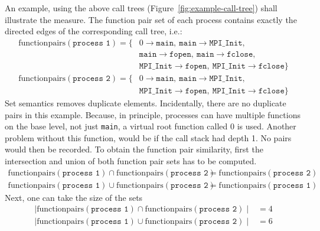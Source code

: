 \documentclass[a4paper, final, diplominf]{zih-template}
\begin{document}
An example, using the above call trees (Figure~\ref{fig:example-call-tree}) shall illustrate the measure.
The function pair set of each process contains exactly the directed edges of the corresponding call tree, i.e.:
\begin{equation*}
	\begin{aligned}
		\text{functionpairs}(\texttt{process 1}) = \{
			& 0 \rightarrow \texttt{main},~\texttt{main} \rightarrow \texttt{MPI\_Init}, \\
			& \texttt{main} \rightarrow \texttt{fopen},~\texttt{main} \rightarrow \texttt{fclose}, \\
			& \texttt{MPI\_Init} \rightarrow \texttt{fopen},~\texttt{MPI\_Init} \rightarrow \texttt{fclose}\} \\
			\text{functionpairs}(\texttt{process 2}) = \{
			& 0 \rightarrow \texttt{main},~\texttt{main} \rightarrow \texttt{MPI\_Init}, \\
			& \texttt{MPI\_Init} \rightarrow \texttt{fopen},~\texttt{MPI\_Init} \rightarrow \texttt{fclose}\}
	\end{aligned}
\end{equation*}
Set semantics removes duplicate elements.
Incidentally, there are no duplicate pairs in this example.
Because, in principle, processes can have multiple functions on the base level, not just \texttt{main}, a virtual root function called 0 is used.
Another problem without this function, would be if the call stack had depth 1.
No pairs would then be recorded.
To obtain the function pair similarity, first the intersection and union of both function pair sets has to be computed.
\begin{equation*}
	\begin{aligned}
		\text{functionpairs}(\texttt{process 1}) \cap \text{functionpairs}(\texttt{process 2}) & = \text{functionpairs}(\texttt{process 2}) \\
		\text{functionpairs}(\texttt{process 1}) \cup \text{functionpairs}(\texttt{process 2}) & = \text{functionpairs}(\texttt{process 1})
	\end{aligned}
\end{equation*}
Next, one can take the size of the sets
\begin{equation*}
	\begin{aligned}
		\mid \text{functionpairs}(\texttt{process 1}) \cap \text{functionpairs}(\texttt{process 2}) \mid & = 4 \\
		\mid \text{functionpairs}(\texttt{process 1}) \cup \text{functionpairs}(\texttt{process 2}) \mid & = 6 \\
	\end{aligned}
\end{equation*}
\end{document}
